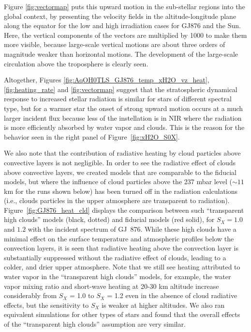 \documentclass[11pt,numberedappendix,twocolappendix,]{emulateapj}
\def\wv{water vapor}
\begin{document}
Figure \ref{fig:vectormap} puts this upward motion in the sub-stellar regions into the global context, by presenting the velocity fields in the altitude-longitude plane along the equator for the low and high irradiation cases for GJ876 and the Sun. %
Here, the vertical components of the vectors are multiplied by 1000 to make them more visible, because large-scale vertical motions are about three orders of magnitude weaker than horizontal motions. %
The development of the large-scale circulation above the troposphere is clearly seen. 

Altogether, Figures \ref{fig:AqOH0TLS_GJ876_temp_xH2O_vz_heat}, \ref{fig:heating_rate} and \ref{fig:vectormap} suggest that the stratospheric dynamical response to increased stellar radiation is similar for stars of different spectral type, but for a warmer star the onset of strong upward motion occurs at a much larger incident flux because less of the instellation is in NIR where the radiation is more efficiently absorbed by \wv{} and clouds. %
This is the reason for the behavior seen in the right panel of Figure~\ref{fig:xH2O_S0X}. 

We also note that the contribution of radiative heating by cloud particles above convective layers is not negligible. 
In order to see the radiative effect of clouds above convective layers, we created models that are comparable to the fiducial models, but where the  influence of cloud particles above the 237 mbar level ($\sim 11$ km for the runs shown below) has been turned off in the radiation calculations (i.e., clouds particles in the upper atmosphere are transparent to radiation). 
Figure~\ref{fig:GJ876_heat_cld} displays the comparison between such ``transparent high clouds'' models (black, dotted) and fiducial models (red solid), for $S_X=1.0$ and $1.2$ with the incident spectrum of GJ~876. 
While these high clouds have a minimal effect on the surface temperature and atmospheric profiles below the convection layers, it is seen that radiative heating above the convection layer is substantially suppressed without the radiative effect of clouds, leading to a colder, and drier upper atmosphere. 
Note that we still see heating attributed to water vapor in the ``transparent high clouds'' models, for example, the \wv{} mixing ratio and short-wave heating at 20-30 km altitude increase considerably from $S_X$ = 1.0 to $S_X$ = 1.2 even in the absence of cloud radiative effects, but the sensitivity to $S_X$ is weaker at higher altitudes. 
We also ran equivalent simulations for other types of stars and found that the overall effects of the ``transparent high clouds'' assumption are very similar. 
\end{document}
